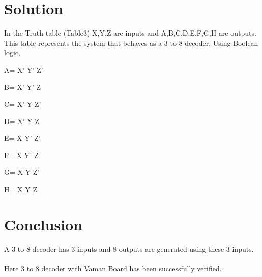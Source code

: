 \documentclass[journal,12pt,twocolumn]{IEEEtran}
\begin{document}
\section{Solution}

In the Truth table (Table3) X,Y,Z are inputs and A,B,C,D,E,F,G,H are outputs. This table represents the system that behaves as a 3 to 8 decoder. Using Boolean logic, \\
 \begin{center}
     A= X' Y' Z'\\
 \end{center}
  \begin{center}
      B= X' Y' Z\\
 \end{center}
  \begin{center}
      C= X' Y Z'\\
 \end{center}
  \begin{center}
      D= X' Y Z\\
 \end{center}
  \begin{center}
     E= X Y' Z'\\
 \end{center}
  \begin{center}
     F= X Y' Z\\
 \end{center}
  \begin{center}
     G= X Y Z'\\
 \end{center}
  \begin{center}
     H= X Y Z\\
 \end{center} 
 \section{Conclusion}
 A 3 to 8 decoder has 3 inputs and 8 outputs are generated using these 3 inputs.\\
 \\
  Here 3 to 8 decoder with Vaman Board has been successfully verified.\\
\end{document}

